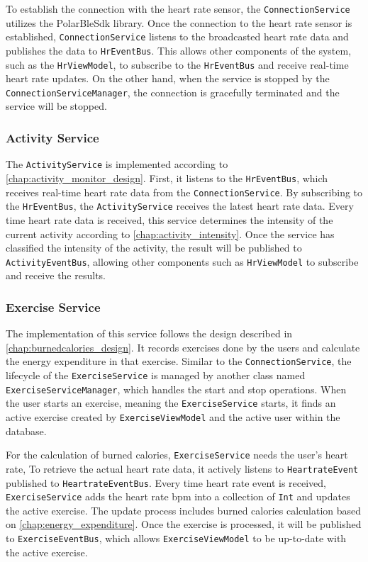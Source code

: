 To establish the connection with the heart rate sensor, the \verb;ConnectionService; utilizes the PolarBleSdk library.
Once the connection to the heart rate sensor is established, \verb;ConnectionService; listens to the broadcasted heart rate data and publishes the data to \verb;HrEventBus;.
This allows other components of the system, such as the \verb;HrViewModel;, to subscribe to the \verb;HrEventBus; and receive real-time heart rate updates. 
On the other hand, when the service is stopped by the \verb;ConnectionServiceManager;, the connection is gracefully terminated and the service will be stopped.

\subsubsection{Activity Service}
The \verb;ActivityService; is implemented according to \autoref{chap:activity_monitor_design}.
First, it listens to the \verb;HrEventBus;, which receives real-time heart rate data from the \verb;ConnectionService;. 
By subscribing to the \verb;HrEventBus;, the \verb;ActivityService; receives the latest heart rate data.
Every time heart rate data is received, this service determines the intensity of the current activity according to \autoref{chap:activity_intensity}.
Once the service has classified the intensity of the activity, the result will be published to \verb;ActivityEventBus;, allowing other components such as \verb;HrViewModel; to subscribe and receive the results.

\subsubsection{Exercise Service}
The implementation of this service follows the design described in \autoref{chap:burnedcalories_design}.
It records exercises done by the users and calculate the energy expenditure in that exercise.
Similar to the \verb;ConnectionService;, the lifecycle of the \verb;ExerciseService; is managed by another class named \verb;ExerciseServiceManager;, which handles the start and stop operations. 
When the user starts an exercise, meaning the \texttt{ExerciseService} starts, it finds an active exercise created by \texttt{ExerciseViewModel} and the active user within the database. 

For the calculation of burned calories, \verb;ExerciseService; needs the user's heart rate, To retrieve the actual heart rate data, it actively listens to \verb;HeartrateEvent; published to \verb;HeartrateEventBus;.
Every time heart rate event is received, \verb;ExerciseService; adds the heart rate bpm into a collection of \verb;Int; and updates the active exercise. The update process includes burned calories calculation based on \autoref{chap:energy_expenditure}. 
Once the exercise is processed, it will be published to \verb;ExerciseEventBus;, which allows \verb;ExerciseViewModel; to be up-to-date with the active exercise.

